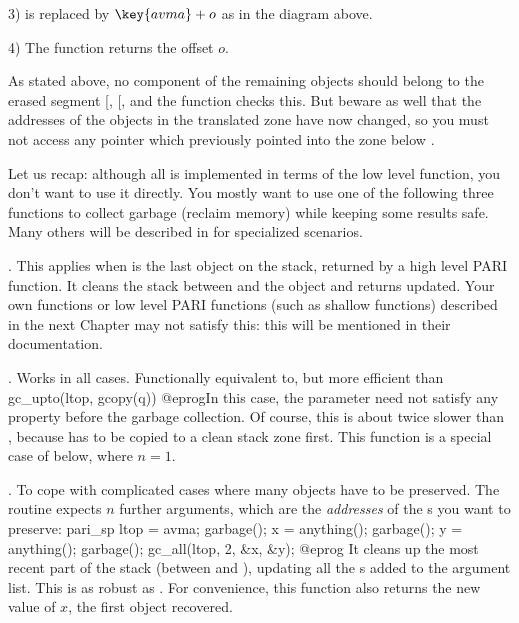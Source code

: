 3)  is replaced by $\key{avma} + o$ as in the diagram above.

4) The function returns the offset $o$.

As stated above, no component of the remaining objects should belong to the
erased segment [, [, and the function checks this.
But beware as well that the addresses of the objects in the translated zone
have now changed, so you must not access any pointer which previously pointed
into the zone below .


Let us recap: although all is implemented in terms of the
 low level function, you don't want to use it directly.
You mostly want to use one of the following three functions to collect
garbage (reclaim memory) while keeping some results safe. Many others will be
described in  for specialized scenarios.

. This applies when  is the last
object on the stack, returned by a high level PARI function. It cleans the
stack between  and the object  and returns  updated.
Your own functions or low level PARI functions (such as shallow functions)
described in the next Chapter may not satisfy this: this will be mentioned in
their documentation.

. Works in all cases. Functionally
equivalent to, but more efficient than
\bprog
  gc_upto(ltop, gcopy(q))
@eprog\noindent In this case, the  parameter  need not
satisfy any property before the garbage collection. Of course, this is about
twice slower than , because  has to be copied to a clean
stack zone first. This function is a special case of  below,
where $n=1$.

.
To cope with complicated cases where many objects have to be preserved. The
routine expects $n$ further arguments, which are the \emph{addresses} of
the s you want to preserve:
\bprog
  pari_sp ltop = avma;
  garbage(); x = anything();
  garbage(); y = anything();
  garbage(); gc_all(ltop, 2, &x, &y);
@eprog\noindent
It cleans up the most recent part of the
stack (between  and ), updating all the s added
to the argument list. This is as robust as . For convenience,
this function also returns the new value of $x$, the first object recovered.

